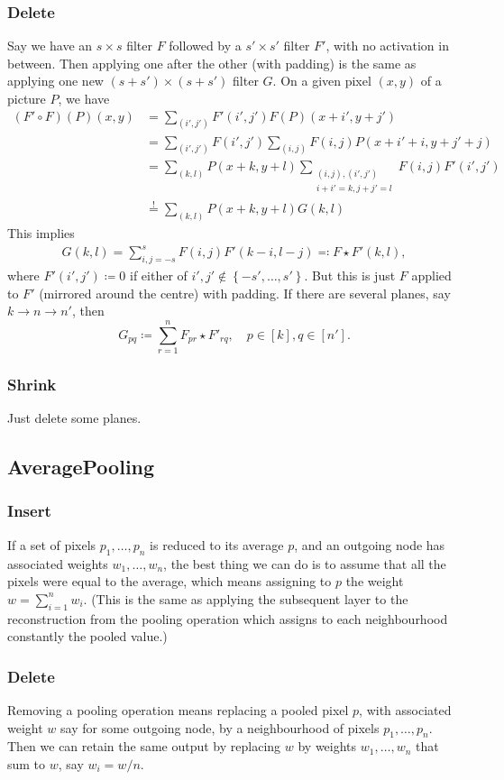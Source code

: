 \documentclass{article}
\theoremstyle{nonumberplain}
\theoremstyle{nonumberplain}
\theoremstyle{empty}
\numberwithin{equation}{section}
\begin{document}
\subsubsection*{Delete}
Say we have an $s\times s$ filter $F$ followed by a $s'\times s'$ filter $F'$, with no activation in between. Then applying one after the other (with padding) is the same as applying one new $(s+s')\times (s+s')$ filter $G$. On a given pixel $(x,y)$ of a picture $P$, we have
\begin{align*}
    (F'\circ F)(P)(x,y) &= \sum_{(i',j')} F'(i',j') F(P)(x+i',y+j') \\
                        &= \sum_{(i',j')} F(i',j') \sum_{(i,j)} F(i,j) P(x+i'+i,y+j'+j)\\
                        &= \sum_{(k,l)} P(x+k,y+l) \sum_{\substack{(i,j),(i',j') \\ i+i'=k, j+j'=l} } F(i,j)F'(i',j')\\
                        &\stackrel{!}{=} \sum_{(k,l)} P(x+k,y+l) G(k,l)
\end{align*}
This implies
\begin{align*}
    G(k,l) = \sum_{i,j = -s}^{s} F(i,j) F'(k-i,l-j) \eqqcolon F \star F'(k,l),
\end{align*}
where $F'(i',j') \coloneqq 0$ if either of $i',j' \not\in  \left\{ -s', \ldots ,s' \right\} $. But this is just $F$ applied to $F'$ (mirrored around the centre) with padding. If there are several planes, say $k \to n \to n'$, then \[
    G_{pq} \coloneqq \sum_{r = 1}^n F_{pr} \star F'_{rq} ,\quad p \in [k], q \in [n'].
\] 

\subsubsection*{Shrink}
Just delete some planes.

\subsection{AveragePooling}
\subsubsection*{Insert}
If a set of pixels $p_1, \ldots ,p_n$ is reduced to its average $p$, and an outgoing node has associated weights $w_1, \ldots ,w_n$, the best thing we can do is to assume that all the pixels were equal to the average, which means assigning to $p$ the weight $w = \sum_{i=1}^n w_i$. (This is the same as applying the subsequent layer to the reconstruction from the pooling operation which assigns to each neighbourhood constantly the pooled value.)

\subsubsection*{Delete}
Removing a pooling operation means replacing a pooled pixel $p$, with associated weight $w$ say for some outgoing node, by a neighbourhood of pixels $p_1, \ldots ,p_n$. Then we can retain the same output by replacing $w$ by weights $w_1, \ldots ,w_n$ that sum to $w$, say $w_i = w / n$.
\end{document}
